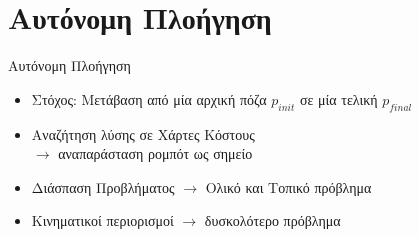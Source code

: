 \documentclass[10pt, compress]{beamer}
\begin{document}
\section{Αυτόνομη Πλοήγηση}

\begin{frame}{Αυτόνομη Πλοήγηση}
	\begin{itemize}
		\item Στόχος: Μετάβαση από μία αρχική πόζα $p_{init}$ σε μία τελική $p_{final}$
		\item	Αναζήτηση λύσης σε Χάρτες Κόστους\\ $\rightarrow$ αναπαράσταση ρομπότ ως  σημείο
		\item Διάσπαση Προβλήματος $\rightarrow$ Ολικό και Τοπικό πρόβλημα
		\item Κινηματικοί περιορισμοί $\rightarrow$ δυσκολότερο πρόβλημα
	\end{itemize}
	\vspace{-0.5cm}
	\begin{figure}
		\centering
		\\[0.5cm]
	\end{figure}
\end{frame}
\end{document}
